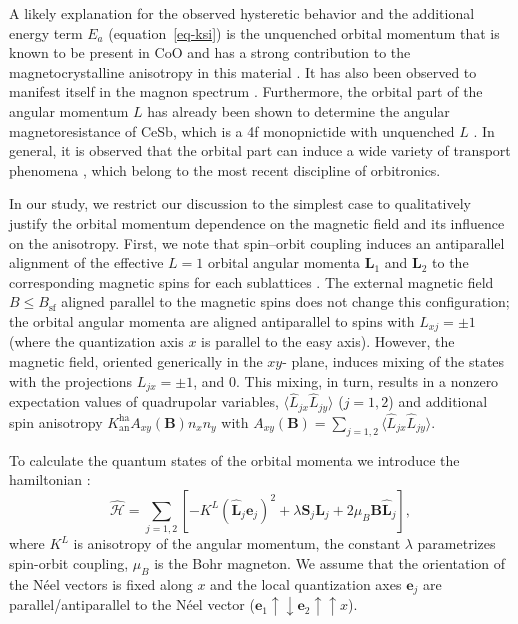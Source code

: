 \documentclass[%
 aps,
prl,
superscriptaddress,
 amsmath,amssymb,
reprint,%
]{revtex4-2}
\begin{document}
A likely explanation for the observed hysteretic behavior and the additional energy term  $E_a$ (equation~\ref{eq-ksi}) is the unquenched orbital momentum that is known to be present in CoO and has a strong contribution to the magnetocrystalline anisotropy in this material \cite{Kanamori1957I, Kanamori1957II}. It has also been observed to manifest itself in the magnon spectrum \cite{Satoh2017}. Furthermore, the orbital part of the angular momentum $L$ has already been shown to determine the angular magnetoresistance of CeSb, which is a 4f monopnictide with unquenched $L$ \cite{Xu2019}. In general, it is observed that the orbital part can induce a wide variety of transport phenomena \cite{Go2021}, which belong to the most recent discipline of orbitronics.

In our study, we restrict our discussion to the simplest case to qualitatively justify the orbital momentum dependence on the magnetic field and its influence on the anisotropy. First, we note that spin--orbit coupling induces an antiparallel alignment of the effective $L=1$  orbital angular momenta $\mathbf{L}_1$ and $\mathbf{L}_2$  to the corresponding magnetic spins for each sublattices \cite{Satoh2017}. The external magnetic field $B\le B_\text{sf}$ aligned parallel to the magnetic spins does not change this configuration; the orbital angular momenta are aligned antiparallel to spins with $L_{xj}=\pm 1$ (where the quantization axis $x$ is parallel to the easy axis). However, the magnetic field, oriented generically in the $xy$- plane, induces mixing of the states with the projections $L_{jx}=\pm1$, and  $0$. This mixing, in turn, results in a nonzero expectation values of  quadrupolar variables, $\langle \hat{L}_{jx}\hat{L}_{jy}\rangle$ ($j=1,2$) and additional spin anisotropy $K^\mathrm{ha}_\mathrm{an}A_{xy}(\mathbf{B})n_xn_y$ with $A_{xy}(\mathbf{B})=\sum_{j=1,2}\langle \hat {L}_{jx} \hat {L}_{jy}\rangle$.

To calculate the quantum states of the orbital momenta we introduce the hamiltonian \cite{Satoh2017}:
\begin{equation}\label{eq-hamiltonian-reduced}
\hat{\mathcal{H}}=\sum_{j=1,2}\left[-K^L\left(\hat{\mathbf{L}}_j\mathbf{e}_j\right)^2+\lambda\mathbf{S}_j\hat{\mathbf{L}}_j+2\mu_B\mathbf{B}\hat{\mathbf{L}}_j\right],
\end{equation}
where $K^L$ is anisotropy of the angular momentum, the constant $\lambda$ parametrizes spin-orbit coupling, $\mu_B$ is the Bohr magneton. We assume that the orientation of the N\'eel vectors is fixed along $x$ and  the local quantization axes $\mathbf{e}_j$ are parallel/antiparallel to the N\'eel vector ($\mathbf{e}_1\uparrow\downarrow\mathbf{e}_2\uparrow\uparrow\hat{x}$).
\end{document}
